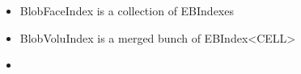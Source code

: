 \begin{itemize}
\item BlobFaceIndex is a collection of EBIndexes
\item BlobVoluIndex is a merged bunch of EBIndex<CELL>
\item   
\end{itemize}
  
